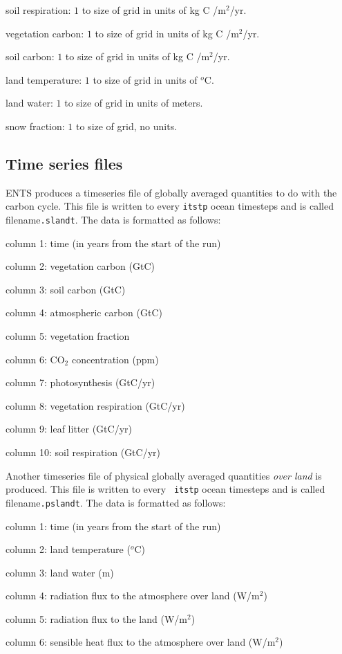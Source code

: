\documentclass[10pt,a4paper]{report}
\begin{document}
soil respiration: $1$ to size of grid in units of kg C /m$^2$/yr.

vegetation carbon: $1$ to size of grid in units of kg C /m$^2$/yr.

soil carbon: $1$ to size of grid in units of kg C /m$^2$/yr.

land temperature: $1$ to size of grid in units of $^{o}$C.

land water: $1$ to size of grid in units of meters.

snow fraction: $1$ to size of grid, no units.

\subsection{Time series files}

ENTS produces a timeseries file of globally averaged quantities to
do with the carbon cycle. This file is written to every {\tt itstp}
ocean timesteps and is called filename{\tt.slandt}. The data is
formatted as follows:

column 1: time (in years from the start of the run)

column 2: vegetation carbon (GtC)

column 3: soil carbon (GtC)

column 4: atmospheric carbon (GtC)

column 5: vegetation fraction

column 6: CO$_{2}$ concentration (ppm)

column 7: photosynthesis (GtC/yr)

column 8: vegetation respiration (GtC/yr)

column 9: leaf litter (GtC/yr)

column 10: soil respiration (GtC/yr)

Another timeseries file of physical globally averaged quantities
\emph{over land} is produced. This file is written to every {\tt
itstp} ocean timesteps and is called filename{\tt.pslandt}. The data
is formatted as follows:

column 1: time (in years from the start of the run)

column 2: land temperature ($^o$C)

column 3: land water (m)

column 4: radiation flux to the atmosphere over land (W/m$^2$)

column 5: radiation flux to the land (W/m$^2$)

column 6: sensible heat flux to the atmosphere over land (W/m$^2$)
\end{document}

